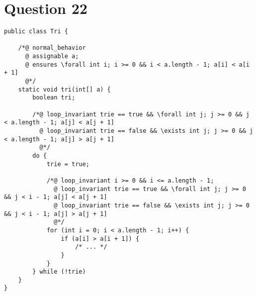 \documentclass{article}
\begin{document}
\section{Question 22}
\begin{lstlisting}
public class Tri {
	
	/*@ normal_behavior
	  @ assignable a;
	  @ ensures \forall int i; i >= 0 && i < a.length - 1; a[i] < a[i + 1]
	  @*/
	static void tri(int[] a) {
		boolean tri;
		
		/*@ loop_invariant trie == true && \forall int j; j >= 0 && j < a.length - 1; a[j] < a[j + 1]
		  @ loop_invariant trie == false && \exists int j; j >= 0 && j < a.length - 1; a[j] > a[j + 1]
		  @*/
		do {
			trie = true;
			
			/*@ loop_invariant i >= 0 && i <= a.length - 1;
		  	  @ loop_invariant trie == true && \forall int j; j >= 0 && j < i - 1; a[j] < a[j + 1]
		  	  @ loop_invariant trie == false && \exists int j; j >= 0 && j < i - 1; a[j] > a[j + 1]
		  	  @*/
			for (int i = 0; i < a.length - 1; i++) {
				if (a[i] > a[i + 1]) {
					/* ... */
				}
			}
		} while (!trie)
	}
} 
\end{lstlisting}
\end{document}
